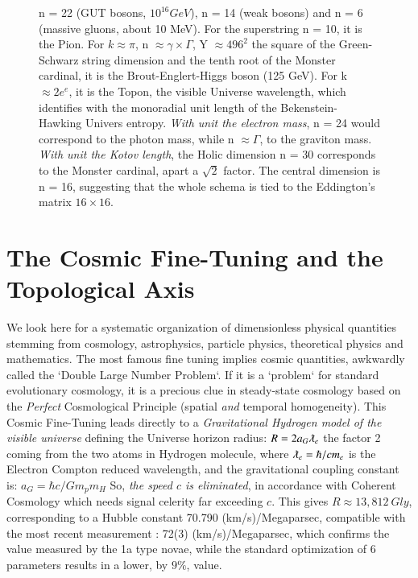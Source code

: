 \documentclass[twoside,draft]{article}
\begin{document}
\begin{sloppypar}
\begin{figure}
{    n = 22 (GUT bosons, $10^{16} GeV$), n = 14 (weak bosons) and n = 6 (massive gluons, about 10 MeV).
    For the superstring n = 10, it is the Pion. For $k \approx \pi$, n $\approx \gamma \times \Gamma$, Y $\approx 496^2$ 
    the square of the Green-Schwarz string dimension and the tenth root of the Monster cardinal, it is
    the Brout-Englert-Higgs boson (125 GeV). For k $\approx 2e^e$, it is the Topon, the visible Universe wavelength,
    which identifies with the monoradial unit length of the Bekenstein-Hawking Univers entropy.
   \textit{With unit the electron mass}, n = 24 would correspond to the photon mass, while  n $\approx \Gamma$, 
    to the graviton mass.
    \textit{With unit the Kotov length}, the Holic dimension n = 30 corresponds to the Monster cardinal, 
    apart a $\sqrt2$ factor.}
    The central dimension is n = 16, suggesting that the whole schema is tied to the Eddington's matrix $16 \times 16$.
\label{fig:figure_label}
\end{figure}

\section {The Cosmic Fine-Tuning and the Topological Axis}
We look here for a systematic organization of dimensionless physical quantities stemming from cosmology, astrophysics, particle   physics, theoretical physics and mathematics.
The most famous fine tuning implies cosmic quantities, awkwardly called the `Double
Large Number Problem`. If it is a `problem` for standard evolutionary cosmology, it is a precious
clue in steady-state cosmology based on the \textit{Perfect} Cosmological Principle (spatial \textit{and} temporal homogeneity).
This Cosmic Fine-Tuning leads directly to a \textit{Gravitational Hydrogen model of the visible universe} \cite{Sanchez1}
defining the Universe horizon radius: $R = 2a_{G} \lambdabar_{e}$ the factor 2 coming from the two atoms in
Hydrogen molecule, where 
$\lambdabar_{e} = \hbar/cm_{e}$
is the Electron Compton reduced wavelength, and the
gravitational coupling constant is: 
$a_{G} = \hbar c/Gm_{p}m_{H}$
So, \textit{the speed $c$ is eliminated}, in accordance with
Coherent Cosmology which needs signal celerity far exceeding $c$. This gives $R \approx 13,812~Gly $, corresponding to a Hubble constant 70.790 (km/s)/Megaparsec, compatible with the
most recent measurement \cite{Bonvin}: 72(3) (km/s)/Megaparsec, which confirms the value measured by the 1a type novae, while the standard optimization of 6 parameters results in a lower, by $9\%$, value.


\end{sloppypar}
\end{document}
